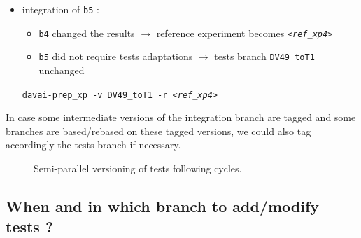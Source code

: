 \documentclass[a4paper,10pt,twoside]{article}
\begin{document}
\begin{itemize}
 \item integration of \texttt{b5} :
 \begin{itemize}
  \item \texttt{b4} changed the results $\rightarrow$ reference experiment becomes \textit{\texttt{<ref\_xp4>}}
  \item \texttt{b5} did not require tests adaptations $\rightarrow$ tests branch \texttt{DV49\_toT1} unchanged
 \end{itemize}
 \texttt{davai-prep\_xp -v DV49\_toT1 -r \textit{<ref\_xp4>}}
\end{itemize}

\noindent In case some intermediate versions of the integration branch are tagged and some branches are based/rebased on these tagged versions, we could also tag accordingly the tests branch if necessary.

\begin{figure}[h!]
 \begin{center}
 \end{center}
 \caption{\label{fig:tests_versioning} Semi-parallel versioning of tests following cycles.}
\end{figure}



\subsection{When and in which branch to add/modify tests ?}
\end{document}
